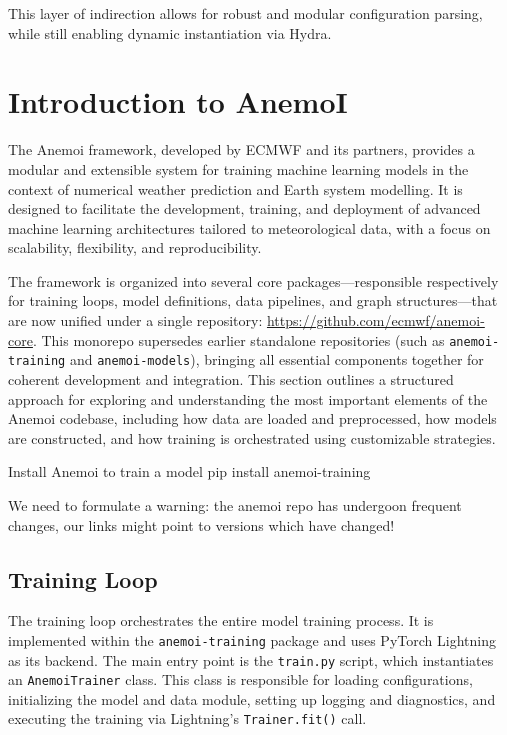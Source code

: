 This layer of indirection allows for robust and modular configuration parsing, while still enabling dynamic instantiation via Hydra.

%
\section{Introduction to AnemoI}

The Anemoi framework, developed by ECMWF and its partners, provides a modular and extensible system for training machine learning models in the context of numerical weather prediction and Earth system modelling. It is designed to facilitate the development, training, and deployment of advanced machine learning architectures tailored to meteorological data, with a focus on scalability, flexibility, and reproducibility. 

The framework is organized into several core packages—responsible respectively for training loops, model definitions, data pipelines, and graph structures—that are now unified under a single repository: \url{https://github.com/ecmwf/anemoi-core}. This monorepo supersedes earlier standalone repositories (such as \texttt{anemoi-training} and \texttt{anemoi-models}), bringing all essential components together for coherent development and integration. This section outlines a structured approach for exploring and understanding the most important elements of the Anemoi codebase, including how data are loaded and preprocessed, how models are constructed, and how training is orchestrated using customizable strategies.

\begin{codeonly}{Install Anemoi to train a model}
pip install anemoi-training
\end{codeonly}

We need to formulate a warning: the anemoi repo has undergoon frequent changes, our links might point to versions which have changed!

%
\subsection{Training Loop}

The training loop orchestrates the entire model training process. It is implemented within the \texttt{anemoi-training} package and uses PyTorch Lightning as its backend. The main entry point is the \texttt{train.py} script, which instantiates an \texttt{AnemoiTrainer} class. This class is responsible for loading configurations, initializing the model and data module, setting up logging and diagnostics, and executing the training via Lightning's \texttt{Trainer.fit()} call.

